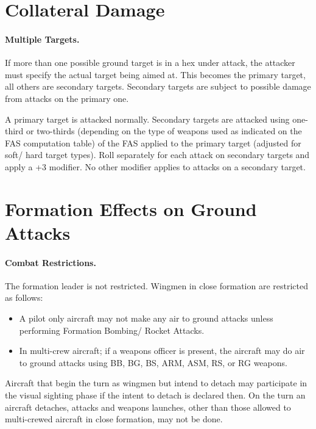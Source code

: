 \begin{advancedrules}

\section{Collateral Damage}

\paragraph{Multiple Targets.} If more than one possible ground target is in a hex under attack, the attacker must specify the actual target being aimed at. This becomes the primary target, all others are secondary targets. Secondary targets are subject to possible damage from attacks on the primary one.

A primary target is attacked normally. Secondary targets are attacked using one-third or two-thirds (depending on the type of weapons used as indicated on the FAS computation table) of the FAS applied to the primary target (adjusted for soft/ hard target types). Roll separately for each attack on secondary targets and apply a +3 modifier.  No other modifier applies to attacks on a secondary target.

\section{Formation Effects on Ground Attacks}

\paragraph{Combat Restrictions.} The formation leader is not restricted. Wingmen in close formation are restricted as follows:
\begin{itemize}
    \item A pilot only aircraft may not make any air to ground attacks unless performing Formation Bombing/ Rocket Attacks.
    \item In multi-crew aircraft; if a weapons officer is present, the aircraft may do air to ground attacks using BB, BG, BS, ARM, ASM, RS, or RG weapons.
\end{itemize}

Aircraft that begin the turn as wingmen but intend to detach may participate in the visual sighting phase if the intent to detach is declared then. On the turn an aircraft detaches, attacks and weapons launches, other than those allowed to multi-crewed aircraft in close formation, may not be done.


\end{advancedrules}
